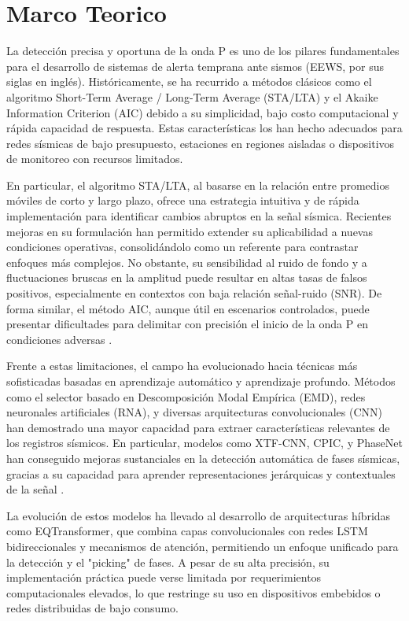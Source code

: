 \chapter{Marco Teorico}\label{problem}

La detección precisa y oportuna de la onda P es uno de los pilares fundamentales para el desarrollo de sistemas de alerta temprana ante sismos (EEWS, por sus siglas en inglés). Históricamente, se ha recurrido a métodos clásicos como el algoritmo Short-Term Average / Long-Term Average (STA/LTA) y el Akaike Information Criterion (AIC) debido a su simplicidad, bajo costo computacional y rápida capacidad de respuesta. Estas características los han hecho adecuados para redes sísmicas de bajo presupuesto, estaciones en regiones aisladas o dispositivos de monitoreo con recursos limitados.

En particular, el algoritmo STA/LTA, al basarse en la relación entre promedios móviles de corto y largo plazo, ofrece una estrategia intuitiva y de rápida implementación para identificar cambios abruptos en la señal sísmica. Recientes mejoras en su formulación han permitido extender su aplicabilidad a nuevas condiciones operativas, consolidándolo como un referente para contrastar enfoques más complejos. No obstante, su sensibilidad al ruido de fondo y a fluctuaciones bruscas en la amplitud puede resultar en altas tasas de falsos positivos, especialmente en contextos con baja relación señal-ruido (SNR). De forma similar, el método AIC, aunque útil en escenarios controlados, puede presentar dificultades para delimitar con precisión el inicio de la onda P en condiciones adversas \cite{kalkan2016automatic, shang2018enhancing}.

Frente a estas limitaciones, el campo ha evolucionado hacia técnicas más sofisticadas basadas en aprendizaje automático y aprendizaje profundo. Métodos como el selector basado en Descomposición Modal Empírica (EMD), redes neuronales artificiales (RNA), y diversas arquitecturas convolucionales (CNN) han demostrado una mayor capacidad para extraer características relevantes de los registros sísmicos. En particular, modelos como XTF-CNN, CPIC, y PhaseNet han conseguido mejoras sustanciales en la detección automática de fases sísmicas, gracias a su capacidad para aprender representaciones jerárquicas y contextuales de la señal \cite{zhu2019deep, bi2021explainable}.

La evolución de estos modelos ha llevado al desarrollo de arquitecturas híbridas como EQTransformer, que combina capas convolucionales con redes LSTM bidireccionales y mecanismos de atención, permitiendo un enfoque unificado para la detección y el "picking" de fases. A pesar de su alta precisión, su implementación práctica puede verse limitada por requerimientos computacionales elevados, lo que restringe su uso en dispositivos embebidos o redes distribuidas de bajo consumo.


